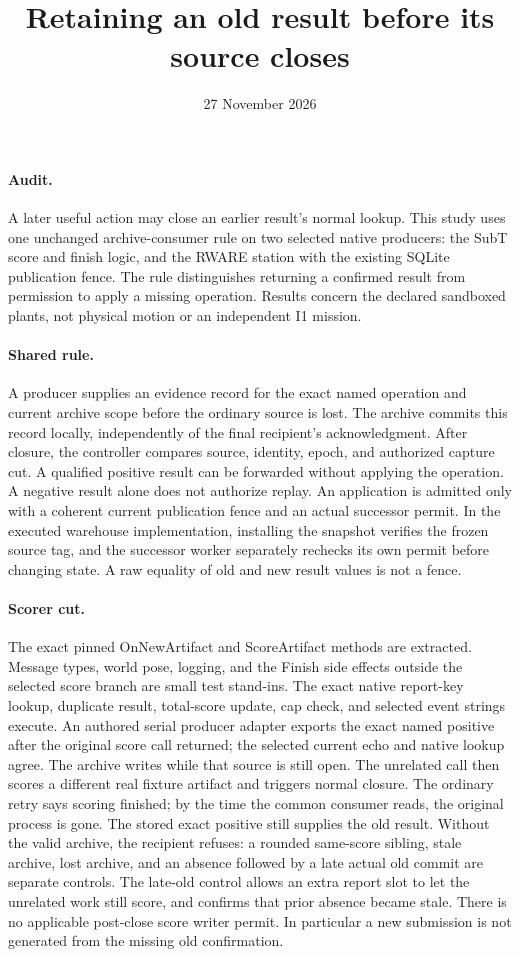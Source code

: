 \documentclass[11pt]{article}
\title{Retaining an old result before its source closes}
\date{27 November 2026}
\begin{document}
\maketitle
\paragraph{Audit.}
A later useful action may close an earlier result's normal lookup.
This study uses one unchanged archive-consumer rule on two selected
native producers: the SubT score and finish logic, and the RWARE
station with the existing SQLite publication fence. The rule
distinguishes returning a confirmed result from permission to apply
a missing operation. Results concern the declared sandboxed plants,
not physical motion or an independent I1 mission.

\paragraph{Shared rule.}
A producer supplies an evidence record for the exact named
operation and current archive scope before the ordinary source
is lost. The archive commits this record locally, independently
of the final recipient's acknowledgment. After closure, the
controller compares source, identity, epoch, and authorized
capture cut. A qualified positive result can be forwarded
without applying the operation. A negative result alone does
not authorize replay. An application is admitted only with a
coherent current publication fence and an actual successor
permit. In the executed warehouse implementation, installing
the snapshot verifies the frozen source tag, and the successor
worker separately rechecks its own permit before changing state.
A raw equality of old and new result values is not a fence.

\paragraph{Scorer cut.}
The exact pinned OnNewArtifact and ScoreArtifact methods are
extracted. Message types, world pose, logging, and the Finish
side effects outside the selected score branch are small
test stand-ins. The exact native report-key lookup, duplicate
result, total-score update, cap check, and selected event
strings execute. An authored serial producer adapter exports
the exact named positive after the original score call returned;
the selected current echo and native lookup agree. The archive
writes while that source is still open. The unrelated call then
scores a different real fixture artifact and triggers normal
closure. The ordinary retry says scoring finished; by the time
the common consumer reads, the original process is gone.
The stored exact positive still supplies the old result.
Without the valid archive, the recipient refuses: a rounded
same-score sibling, stale archive, lost archive, and an absence
followed by a late actual old commit are separate controls.
The late-old control allows an extra report slot to let the
unrelated work still score, and confirms that prior absence
became stale. There is no applicable post-close score writer
permit. In particular a new submission is not generated
from the missing old confirmation.
\end{document}
